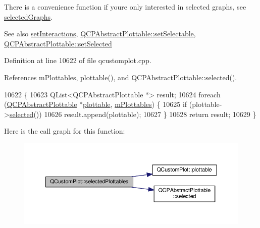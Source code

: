 There is a convenience function if you\textquotesingle{}re only interested in selected graphs, see \hyperlink{class_q_custom_plot_ad2a0493bdd01e7aa99a4209ae3a5b67b}{selected\+Graphs}.

\begin{DoxySeeAlso}{See also}
\hyperlink{class_q_custom_plot_a5ee1e2f6ae27419deca53e75907c27e5}{set\+Interactions}, \hyperlink{class_q_c_p_abstract_plottable_a22c69299eb5569e0f6bf084877a37dc4}{Q\+C\+P\+Abstract\+Plottable\+::set\+Selectable}, \hyperlink{class_q_c_p_abstract_plottable_afbd5428c2952f59d952e11ab5cd79176}{Q\+C\+P\+Abstract\+Plottable\+::set\+Selected} 
\end{DoxySeeAlso}


Definition at line 10622 of file qcustomplot.\+cpp.



References m\+Plottables, plottable(), and Q\+C\+P\+Abstract\+Plottable\+::selected().


\begin{DoxyCode}
10622                                                                     \{
10623   QList<QCPAbstractPlottable *> result;
10624   \textcolor{keywordflow}{foreach} (\hyperlink{class_q_c_p_abstract_plottable}{QCPAbstractPlottable} *\hyperlink{class_q_custom_plot_adea38bdc660da9412ba69fb939031567}{plottable}, 
      \hyperlink{class_q_custom_plot_a4b6c694fbdb2f201626f71eff2d1694e}{mPlottables}) \{
10625     \textcolor{keywordflow}{if} (plottable->\hyperlink{class_q_c_p_abstract_plottable_ab901903adcb0e29467d63de72340ab29}{selected}())
10626       result.append(plottable);
10627   \}
10628   \textcolor{keywordflow}{return} result;
10629 \}
\end{DoxyCode}


Here is the call graph for this function\+:\nopagebreak
\begin{figure}[H]
\begin{center}
\leavevmode
\includegraphics[width=350pt]{class_q_custom_plot_a6721b8c689bb7f2f400987e580508fe8_cgraph}
\end{center}
\end{figure}


